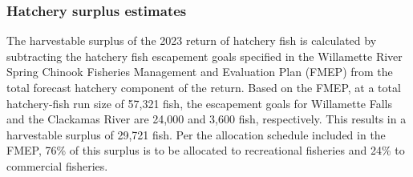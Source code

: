 \documentclass[12pt,]{article}
\begin{document}
\renewcommand*{\arraystretch}{1}

\newpage

\hypertarget{hatchery-surplus-estimates}{%
\subsubsection{Hatchery surplus
estimates}\label{hatchery-surplus-estimates}}

The harvestable surplus of the 2023 return of hatchery fish is
calculated by subtracting the hatchery fish escapement goals specified
in the Willamette River Spring Chinook Fisheries Management and
Evaluation Plan (FMEP) from the total forecast hatchery component of the
return. Based on the FMEP, at a total hatchery-fish run size of 57,321
fish, the escapement goals for Willamette Falls and the Clackamas River
are 24,000 and 3,600 fish, respectively. This results in a harvestable
surplus of 29,721 fish. Per the allocation schedule included in the
FMEP, 76\% of this surplus is to be allocated to recreational fisheries
and 24\% to commercial fisheries.
\end{document}
